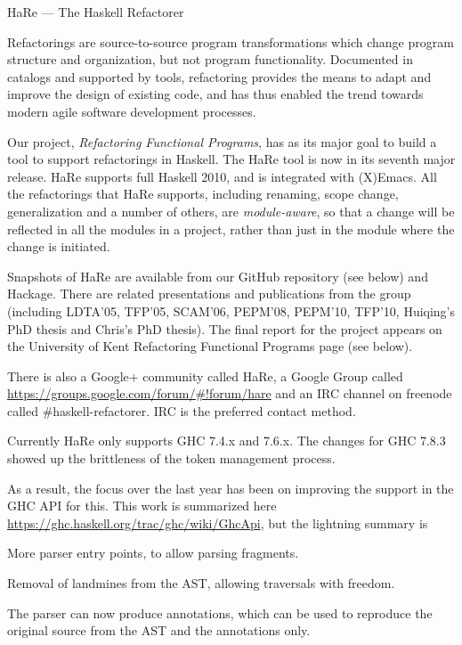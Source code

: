 \begin{hcarentry}[updated]{HaRe --- The Haskell Refactorer}
\label{hare}
\makeheader

Refactorings are source-to-source program transformations which change
program structure and organization, but not program functionality.
Documented in catalogs and supported by tools, refactoring provides
the means to adapt and improve the design of existing code, and has
thus enabled the trend towards modern agile software development
processes.

Our project, \emph{Refactoring Functional Programs}, has as its major
goal to build a tool to support refactorings in Haskell. The HaRe tool
is now in its seventh major release. HaRe supports full Haskell 2010,
and is integrated with (X)Emacs. All the refactorings that HaRe
supports, including renaming, scope change, generalization and a
number of others, are \emph{module-aware}, so that a change will be
reflected in all the modules in a project, rather than just in the
module where the change is initiated.

Snapshots of HaRe are available from our GitHub repository (see below)
and Hackage. There are related presentations and publications from the
group (including LDTA'05, TFP'05, SCAM'06, PEPM'08, PEPM'10, TFP'10,
Huiqing's PhD thesis and Chris's PhD thesis). The final report for the
project appears on the University of Kent Refactoring Functional
Programs page (see below).

There is also a Google+ community called HaRe, a Google Group called
\url{https://groups.google.com/forum/#!forum/hare} and an IRC channel on
freenode called \#haskell-refactorer. IRC is the preferred contact method.

Currently HaRe only supports GHC 7.4.x and 7.6.x. The changes for GHC
7.8.3 showed up the brittleness of the token management process.

As a result, the focus over the last year has been on improving the support in
the GHC API for this. This work is summarized here
\url{https://ghc.haskell.org/trac/ghc/wiki/GhcApi}, but the lightning summary is

\begin{compactitem}

\item More parser entry points, to allow parsing fragments.
\item Removal of landmines from the AST, allowing traversals with
  freedom.
\item The parser can now produce annotations, which can be used to
  reproduce the original source from the AST and the annotations only.


\end{compactitem}
\end{hcarentry}
